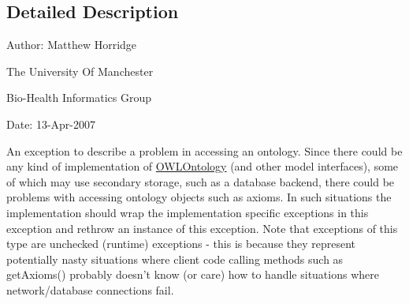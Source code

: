 \subsection{Detailed Description}
Author\-: Matthew Horridge\par
 The University Of Manchester\par
 Bio-\/\-Health Informatics Group\par
 Date\-: 13-\/\-Apr-\/2007\par
\par


An exception to describe a problem in accessing an ontology. Since there could be any kind of implementation of {\ttfamily \hyperlink{interfaceorg_1_1semanticweb_1_1owlapi_1_1model_1_1_o_w_l_ontology}{O\-W\-L\-Ontology}} (and other model interfaces), some of which may use secondary storage, such as a database backend, there could be problems with accessing ontology objects such as axioms. In such situations the implementation should wrap the implementation specific exceptions in this exception and rethrow an instance of this exception. Note that exceptions of this type are unchecked (runtime) exceptions -\/ this is because they represent potentially nasty situations where client code calling methods such as get\-Axioms() probably doesn't know (or care) how to handle situations where network/database connections fail. 

